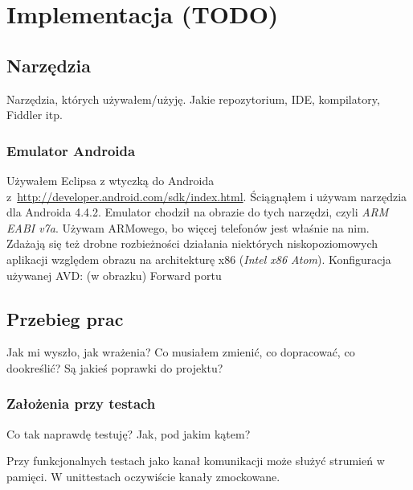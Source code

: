 \chapter{Implementacja (TODO)}

\section{Narzędzia}
Narzędzia, których używałem/użyję. Jakie repozytorium, IDE, kompilatory, Fiddler itp.

\subsection{Emulator Androida}
Używałem Eclipsa z wtyczką do Androida z~\url{http://developer.android.com/sdk/index.html}.
Ściągnąłem i używam narzędzia dla Androida 4.4.2.
Emulator chodził na obrazie do tych narzędzi, czyli \emph{ARM EABI v7a}. Używam ARMowego, bo więcej telefonów jest właśnie na nim. Zdażają się też drobne rozbieżności działania niektórych niskopoziomowych aplikacji względem obrazu na architekturę x86 (\emph{Intel x86 Atom}).
Konfiguracja używanej AVD: (w obrazku)
Forward portu

\section{Przebieg prac}
Jak mi wyszło, jak wrażenia? Co musiałem zmienić, co dopracować, co dookreślić? Są jakieś poprawki do projektu?

\subsection{Założenia przy testach}
Co tak naprawdę testuję? Jak, pod jakim kątem?

Przy funkcjonalnych testach jako kanał komunikacji może służyć strumień w pamięci. W unittestach oczywiście kanały zmockowane.